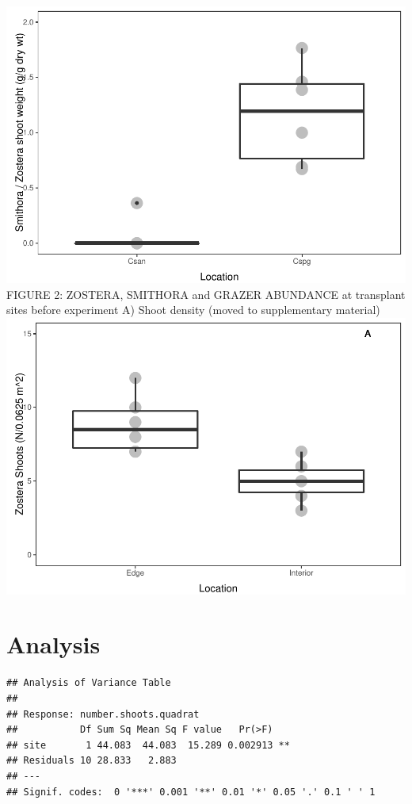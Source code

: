 \documentclass[]{article}
\begin{document}
\includegraphics{Griffiths_et_al_analyses_and_figures_files/figure-latex/unnamed-chunk-6-1.pdf}
FIGURE 2: ZOSTERA, SMITHORA and GRAZER ABUNDANCE at transplant sites
before experiment A) Shoot density (moved to supplementary material)
\includegraphics{Griffiths_et_al_analyses_and_figures_files/figure-latex/unnamed-chunk-7-1.pdf}

\section{Analysis}\label{analysis}

\begin{verbatim}
## Analysis of Variance Table
## 
## Response: number.shoots.quadrat
##           Df Sum Sq Mean Sq F value   Pr(>F)   
## site       1 44.083  44.083  15.289 0.002913 **
## Residuals 10 28.833   2.883                    
## ---
## Signif. codes:  0 '***' 0.001 '**' 0.01 '*' 0.05 '.' 0.1 ' ' 1
\end{verbatim}
\end{document}
